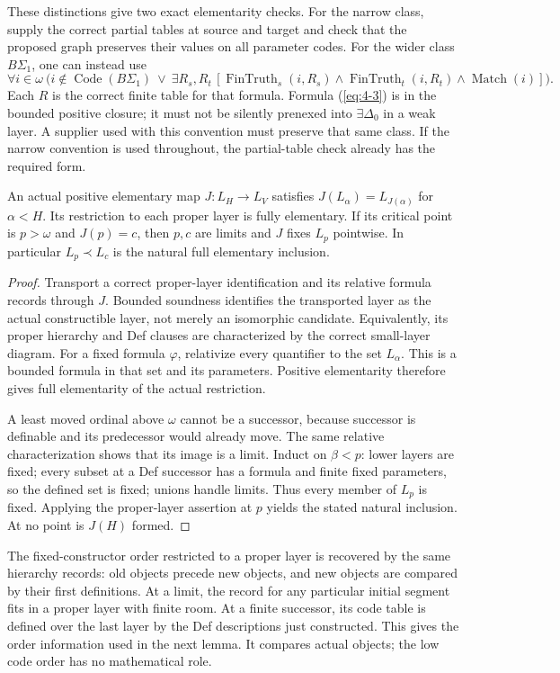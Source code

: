 These distinctions give two exact elementarity checks. For the narrow
class, supply the correct partial tables at source and target and check
that the proposed graph preserves their values on all parameter codes.
For the wider class $B\Sigma_1$, one can instead use
\begin{equation}\label{eq:4-3}
 \forall i\in\omega\ \bigl(i\notin\operatorname{Code}(B\Sigma_1)
 \ \lor\ \exists R_s,R_t\,
 [\operatorname{FinTruth}_s(i,R_s)\wedge
  \operatorname{FinTruth}_t(i,R_t)\wedge\operatorname{Match}(i)]\bigr).
\end{equation}
Each $R$ is the correct finite table for that formula. Formula (\ref{eq:4-3}) is
in the bounded positive closure; it must not be silently prenexed into
$\exists\Delta_0$ in a weak layer. A supplier used with this convention
must preserve that same class. If the narrow convention is used
throughout, the partial-table check already has the required form.

\begin{lemma}\label{lem:proper-layers}
An actual positive elementary map $J:L_H\to L_V$ satisfies
$J(L_\alpha)=L_{J(\alpha)}$ for $\alpha<H$. Its restriction to each
proper layer is fully elementary. If its critical point is $p>\omega$
and $J(p)=c$, then $p,c$ are limits and $J$ fixes $L_p$ pointwise.
In particular $L_p\prec L_c$ is the natural full elementary inclusion.
\end{lemma}
\begin{proof}
Transport a correct proper-layer identification and its relative
formula records through $J$. Bounded soundness identifies the transported
layer as the actual constructible layer, not merely an isomorphic
candidate. Equivalently, its proper hierarchy and Def clauses are
characterized by the correct small-layer diagram. For a fixed formula
$\varphi$, relativize every quantifier to the set $L_\alpha$. This is
a bounded formula in that set and its parameters. Positive elementarity
therefore gives full elementarity of the actual restriction.

A least moved ordinal above $\omega$ cannot be a successor, because
successor is definable and its predecessor would already move. The same
relative characterization shows that its image is a limit. Induct on
$\beta<p$: lower layers are fixed; every subset at a Def successor has
a formula and finite fixed parameters, so the defined set is fixed;
unions handle limits. Thus every member of $L_p$ is fixed. Applying the
proper-layer assertion at $p$ yields the stated natural inclusion.
At no point is $J(H)$ formed.
\end{proof}

The fixed-constructor order restricted to a proper layer is recovered
by the same hierarchy records: old objects precede new objects, and
new objects are compared by their first definitions. At a limit, the
record for any particular initial segment fits in a proper layer with
finite room. At a finite successor, its code table is defined over the
last layer by the Def descriptions just constructed. This gives the
order information used in the next lemma. It compares actual objects;
the low code order has no mathematical role.
